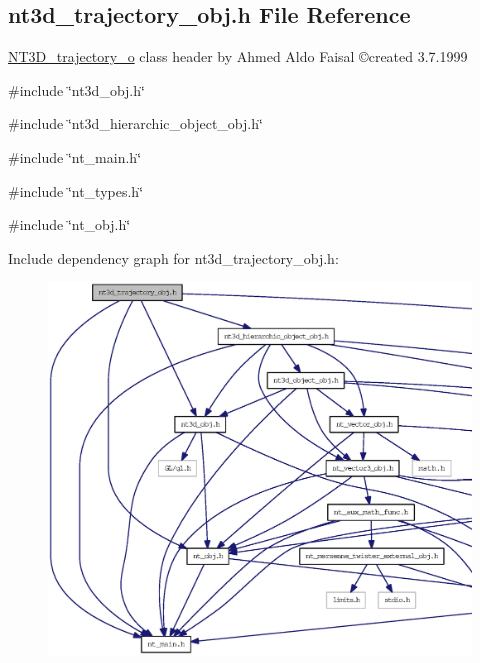 \subsection{nt3d\_\-trajectory\_\-obj.h File Reference}
\label{nt3d__trajectory__obj_8h}



\begin{DoxyItemize}
\item \hyperlink{class_n_t3_d__trajectory__o}{NT3D\_\-trajectory\_\-o} class header by Ahmed Aldo Faisal \copyright created 3.7.1999 
\end{DoxyItemize} 


{\ttfamily \#include \char`\"{}nt3d\_\-obj.h\char`\"{}}\par
{\ttfamily \#include \char`\"{}nt3d\_\-hierarchic\_\-object\_\-obj.h\char`\"{}}\par
{\ttfamily \#include \char`\"{}nt\_\-main.h\char`\"{}}\par
{\ttfamily \#include \char`\"{}nt\_\-types.h\char`\"{}}\par
{\ttfamily \#include \char`\"{}nt\_\-obj.h\char`\"{}}\par
Include dependency graph for nt3d\_\-trajectory\_\-obj.h:
\nopagebreak
\begin{figure}[H]
\begin{center}
\leavevmode
\includegraphics[width=400pt]{nt3d__trajectory__obj_8h__incl}
\end{center}
\end{figure}
